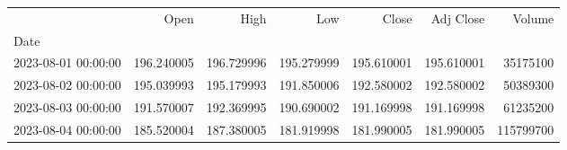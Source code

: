 \begin{tabular}{lrrrrrr}
\toprule
 & Open & High & Low & Close & Adj Close & Volume \\
Date &  &  &  &  &  &  \\
\midrule
2023-08-01 00:00:00 & 196.240005 & 196.729996 & 195.279999 & 195.610001 & 195.610001 & 35175100 \\
2023-08-02 00:00:00 & 195.039993 & 195.179993 & 191.850006 & 192.580002 & 192.580002 & 50389300 \\
2023-08-03 00:00:00 & 191.570007 & 192.369995 & 190.690002 & 191.169998 & 191.169998 & 61235200 \\
2023-08-04 00:00:00 & 185.520004 & 187.380005 & 181.919998 & 181.990005 & 181.990005 & 115799700 \\
\bottomrule
\end{tabular}
